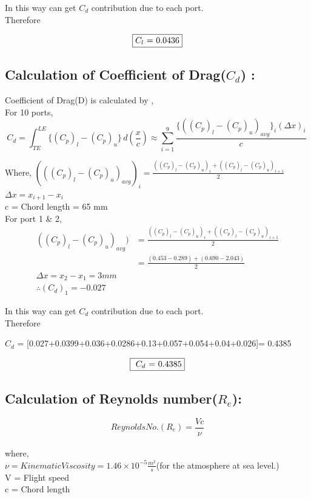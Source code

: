 \documentclass[12pt,a4paper]{article}
\begin{document}
In this way can get $C_d$ contribution due to each port.\\
Therefore

$$\framebox{$C_l$ = 0.0436}$$




\subsection{Calculation of Coefficient of Drag($C_d$) :}
Coefficient of Drag(D) is calculated by , \\
For 10 ports,\[ C_d = \int_{TE}^{LE} \{(C_p)_{l} - (C_p)_{u}\} \,d(\frac{x}{c})  \approx  \sum_{i=1}^{9} \frac{\{((C_p)_{l} - (C_p)_{u})_{avg}\}_i (\Delta x)_i}{c}\ \]

Where, $ (((C_p)_{l} - (C_p)_{u})_{avg})_i = \frac{((C_p)_{l} - (C_p)_{u})_{i}+((C_p)_{l} - (C_p)_{u})_{i+1}}{2}$ \\
$\Delta x = x_{i+1} - x_i$ \\
c = Chord length = 65 mm\\



For port 1 \& 2, \\
\begin{align*}
    ((C_p)_{l} - (C_p)_{u})_{avg}) &=  \frac{((C_p)_{l} - (C_p)_{u})_{i}+((C_p)_{l} - (C_p)_{u})_{i+1}}{2} \\
    &=\frac{(0.453-0.289)+(0.690-2.043)}{2} \\
    \Delta x = x_{2}-x_{1} = 3 mm\\
    \therefore (C_d)_1 = -0.027
\end{align*}

In this way can get $C_d$ contribution due to each port.\\
Therefore

$C_d$ = [0.027+0.0399+0.036+0.0286+0.13+0.057+0.054+0.04+0.026]= 0.4385

$$\framebox{ $C_d$ = 0.4385} $$






\subsection{Calculation of  Reynolds number($R_e$):}
$$ Reynolds No.(R_e) = \frac{Vc}{\nu}$$ \\


where,\\
$\nu = Kinematic Viscosity = 1.46\times 10^{-5} \frac{m^{2}}{s}$(for the atmosphere at sea level.)\\
V = Flight speed\\
c = Chord length
\end{document}
